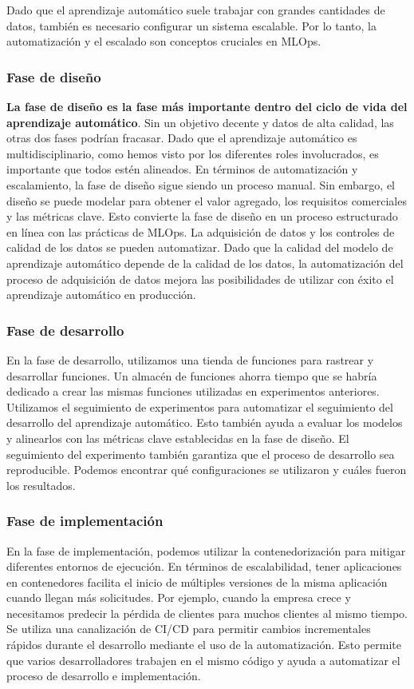 \documentclass[10pt]{book}
\begin{document}
Dado que el aprendizaje automático suele trabajar con grandes cantidades de datos, también es necesario configurar un sistema escalable. Por lo tanto, la automatización y el escalado son conceptos cruciales en MLOps.

\subsubsection{Fase de diseño}
\textbf{La fase de diseño es la fase más importante dentro del ciclo de vida del aprendizaje automático}. Sin un objetivo decente y datos de alta calidad, las otras dos fases podrían fracasar. Dado que el aprendizaje automático es multidisciplinario, como hemos visto por los diferentes roles involucrados, es importante que todos estén alineados. En términos de automatización y escalamiento, la fase de diseño sigue siendo un proceso manual. Sin embargo, el diseño se puede modelar para obtener el valor agregado, los requisitos comerciales y las métricas clave. Esto convierte la fase de diseño en un proceso estructurado en línea con las prácticas de MLOps. La adquisición de datos y los controles de calidad de los datos se pueden automatizar. Dado que la calidad del modelo de aprendizaje automático depende de la calidad de los datos, la automatización del proceso de adquisición de datos mejora las posibilidades de utilizar con éxito el aprendizaje automático en producción.

\subsubsection{Fase de desarrollo}
En la fase de desarrollo, utilizamos una tienda de funciones para rastrear y desarrollar funciones. Un almacén de funciones ahorra tiempo que se habría dedicado a crear las mismas funciones utilizadas en experimentos anteriores. Utilizamos el seguimiento de experimentos para automatizar el seguimiento del desarrollo del aprendizaje automático. Esto también ayuda a evaluar los modelos y alinearlos con las métricas clave establecidas en la fase de diseño. El seguimiento del experimento también garantiza que el proceso de desarrollo sea reproducible. Podemos encontrar qué configuraciones se utilizaron y cuáles fueron los resultados.

\subsubsection{Fase de implementación}
En la fase de implementación, podemos utilizar la contenedorización para mitigar diferentes entornos de ejecución. En términos de escalabilidad, tener aplicaciones en contenedores facilita el inicio de múltiples versiones de la misma aplicación cuando llegan más solicitudes. Por ejemplo, cuando la empresa crece y necesitamos predecir la pérdida de clientes para muchos clientes al mismo tiempo. Se utiliza una canalización de CI/CD para permitir cambios incrementales rápidos durante el desarrollo mediante el uso de la automatización. Esto permite que varios desarrolladores trabajen en el mismo código y ayuda a automatizar el proceso de desarrollo e implementación.
\end{document}
